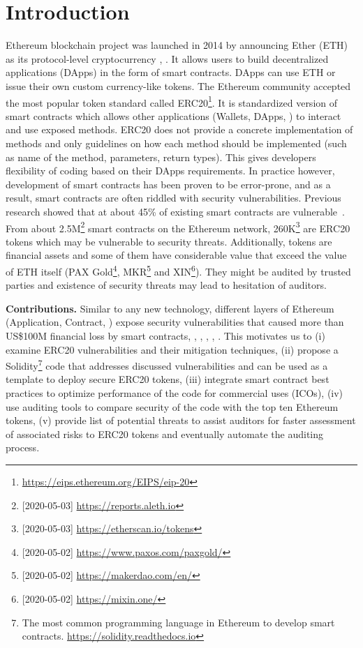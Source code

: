 
\section{Introduction}
\label{sect:introduction}

Ethereum blockchain project was launched in 2014 by announcing Ether (ETH) as its protocol-level cryptocurrency \cite{EthGit}, \cite{EIP150}. It allows users to build decentralized applications (DApps) in the form of smart contracts. DApps can use ETH or issue their own custom currency-like tokens. The Ethereum community accepted the most popular token standard called ERC20\footnote{\url{https://eips.ethereum.org/EIPS/eip-20}}. It is standardized version of smart contracts which allows other applications (\eg Wallets, DApps, \etc) to interact and use exposed methods. ERC20 does not provide a concrete implementation of methods and only guidelines on how each method should be implemented (such as name of the method, parameters, return types). This gives developers flexibility of coding based on their DApps requirements. In practice however, development of smart contracts has been proven to be error-prone, and as a result, smart contracts are often riddled with security vulnerabilities. Previous research showed that at about 45\% of existing smart contracts are vulnerable~\cite{MakSm}. From about 2.5M\footnote{[2020-05-03] \url{https://reports.aleth.io}} smart contracts on the Ethereum network, 260K\footnote{[2020-05-03] \url{https://etherscan.io/tokens}} are ERC20 tokens which may be vulnerable to security threats. Additionally, tokens are financial assets and some of them have considerable value that exceed the value of ETH itself (\eg PAX Gold\footnote{[2020-05-02] \url{https://www.paxos.com/paxgold/}}, MKR\footnote{[2020-05-02] \url{https://makerdao.com/en/}} and XIN\footnote{[2020-05-02] \url{https://mixin.one/}}). They might be audited by trusted parties and existence of security threats may lead to hesitation of auditors.\newline

\noindent\textbf{Contributions.} Similar to any new technology, different layers of Ethereum (\eg Application, Contract, \etc) expose security vulnerabilities that caused more than US\$100M financial loss by smart contracts\cite{DAO1}, \cite{PeckShield}, \cite{PartiyMultiSig}, \cite{MyEthWallet}, \cite{ParityFirstHack}, \cite{ParitySecondHack}. This motivates us to (i) examine ERC20 vulnerabilities and their mitigation techniques, (ii) propose a Solidity\footnote{The most common programming language in Ethereum to develop smart contracts. \url{https://solidity.readthedocs.io}} code that addresses discussed vulnerabilities and can be used as a template to deploy secure ERC20 tokens, (iii) integrate smart contract best practices to optimize performance of the code for commercial uses (\eg ICOs), (iv) use auditing tools to compare security of the code with the top ten Ethereum tokens, (v) provide list of potential threats to assist auditors for faster assessment of associated risks to ERC20 tokens and eventually automate the auditing process.